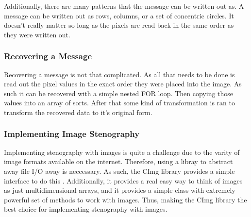\documentclass[12pt]{article}
\begin{document}
      Additionally, there are many patterns that the message can be
      written out as. A message can be written out as rows, columns,
      or a set of concentric circles. It doesn't really matter so long
      as the pixels are read back in the same order as they were
      written out.
          
    \subsubsection{Recovering a Message}    
      Recovering a message is not that complicated. As all that needs
      to be done is read out the pixel values in the exact order they
      were placed into the image. As such it can be recovered with a
      simple nested FOR loop. Then copying those values into an array
      of sorts. After that some kind of transformation is ran to
      transform the recovered data to it's original form.

    \subsubsection{Implementing Image Stenography}
      Implementing stenography with images is quite a challenge due to
      the varity of image formats available on the internet. Therefore,
      using a libray to abstract away file I/O away is neccessary.  As
      such, the CImg library provides a simple interface to do this
      \cite{cimg}. Additionally, it provides a real easy way to think of
      images as just multidimensional arrays, and it provides a simple
      class with extremely powerful set of methods to work with images.
      Thus, making the CImg library the best choice for implementing 
      stenography with images.

      


\end{document}
